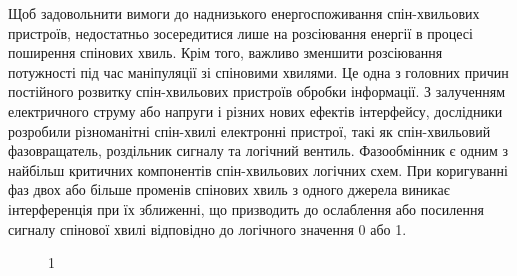 \documentclass[a4paper,14pt]{extreport}
\begin{document}
 Щоб задовольнити вимоги до наднизького енергоспоживання спін-хвильових пристроїв, недостатньо зосередитися лише на розсіювання енергії в процесі поширення спінових хвиль. Крім того, важливо зменшити розсіювання потужності під час маніпуляції зі спіновими хвилями. Це одна з головних причин постійного розвитку спін-хвильових пристроїв обробки інформації. З залученням електричного струму або напруги \cite{lit2} і різних нових ефектів інтерфейсу, дослідники розробили різноманітні спін-хвилі електронні пристрої, такі як спін-хвильовий фазовращатель, роздільник сигналу та логічний вентиль. Фазообмінник є одним з найбільш критичних компонентів спін-хвильових логічних схем. При коригуванні фаз двох або більше променів спінових хвиль з одного джерела виникає інтерференція при їх зближенні, що призводить до ослаблення або посилення сигналу спінової хвилі відповідно до логічного значення 0 або 1. \\
\begin{figure}[h]
   \caption{1}
 \end{figure}
\end{document}
